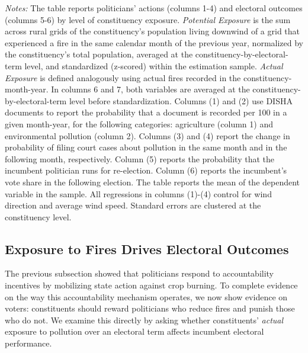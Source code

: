 \documentclass[12pt]{article}
\let\SourceInput
\renewcommand{}[1]{%
  \IfFileExists{../../#1}{\SourceInput{../../#1}}{%
    \IfFileExists{../../#1.tex}{\SourceInput{../../#1.tex}}{%
      \fbox{\scriptsize Missing table: \detokenize{#1}}}}}
\begin{document}
\begin{table}[htbp!] 
\caption{Pollution Exposure, Politicians' Actions, and Electoral Consequences, rural grid $\times$ Any Fire $\times$ Downwind Population}\label{tab:mechanism}
        \resizebox{\linewidth}{!}{
        
        }
    \begin{minipage}{\textwidth}
        {\footnotesize \textit{Notes:} The table reports politicians' actions (columns 1-4) and electoral outcomes (columns 5-6) by level of constituency exposure.
        \textit{Potential Exposure} is the sum across rural grids of the constituency's population living downwind of a grid that experienced a fire in the same calendar month of the previous year, normalized by the constituency's total population, averaged at the constituency-by-electoral-term level, and standardized (z-scored) within the estimation sample.
        \textit{Actual Exposure} is defined analogously using actual fires recorded in the   constituency-month-year. In columns 6 and 7, both variables are averaged at  the constituency-by-electoral-term level before standardization.
        Columns (1) and (2) use DISHA documents to report the probability that a document is recorded per 100 in a given month-year, for the following categories: agriculture (column 1) and environmental pollution (column 2). Columns (3) and (4) report the change in probability of filing court cases about pollution in the same month and in the following month, respectively. Column (5) reports the probability that the incumbent politician runs for re-election. Column (6) reports the incumbent's vote share in the following election.
        The table reports the mean of the dependent variable in the sample. All regressions in columns (1)-(4) control for wind direction and average wind speed. Standard errors are clustered at the constituency level.
        }
    \end{minipage}
\end{table}


\subsection{Exposure to Fires Drives Electoral Outcomes}

The previous subsection showed that politicians respond to accountability incentives by mobilizing state action against crop burning. To complete evidence on the way this accountability mechanism operates, we now show evidence on voters: constituents should reward politicians who reduce fires and punish those who do not. We examine this directly by asking whether constituents' \textit{actual} exposure to pollution over an electoral term affects incumbent electoral performance.
\end{document}
